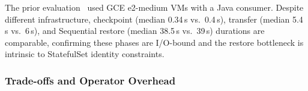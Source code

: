 \documentclass[conference]{IEEEtran}
\begin{document}
%
The prior evaluation~\cite{dinhtuan2025k8s} used GCE e2-medium VMs with a
Java consumer. Despite different infrastructure, checkpoint (median 0.34\,s
vs.\ 0.4\,s), transfer (median 5.4\,s vs.\ 6\,s), and
Sequential restore (median 38.5\,s vs.\ 39\,s) durations are
comparable, confirming these phases are I/O-bound and the restore bottleneck is
intrinsic to StatefulSet identity constraints.

\subsubsection{Trade-offs and Operator Overhead}
\end{document}
